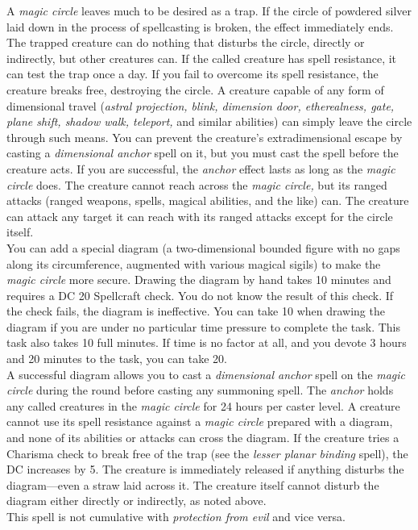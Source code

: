 A \textit{magic circle }leaves much to be desired as a trap. If the circle of powdered silver laid down in the process of spellcasting is broken, the effect immediately ends. The trapped creature can do nothing that disturbs the circle, directly or indirectly, but other creatures can. If the called creature has spell resistance, it can test the trap once a day. If you fail to overcome its spell resistance, the creature breaks free, destroying the circle. A creature capable of any form of dimensional travel (\textit{astral projection, blink, dimension door, etherealness, gate, plane shift, shadow walk, teleport, }and similar abilities) can simply leave the circle through such means. You can prevent the creature's extradimensional escape by casting a \textit{dimensional anchor }spell on it, but you must cast the spell before the creature acts. If you are successful, the \textit{anchor }effect lasts as long as the \textit{magic circle }does. The creature cannot reach across the \textit{magic circle, }but its ranged attacks (ranged weapons, spells, magical abilities, and the like) can. The creature can attack any target it can reach with its ranged attacks except for the circle itself.\\
You can add a special diagram (a two-dimensional bounded figure with no gaps along its circumference, augmented with various magical sigils) to make the \textit{magic circle }more secure. Drawing the diagram by hand takes 10 minutes and requires a DC 20 Spellcraft check. You do not know the result of this check. If the check fails, the diagram is ineffective. You can take 10 when drawing the diagram if you are under no particular time pressure to complete the task. This task also takes 10 full minutes. If time is no factor at all, and you devote 3 hours and 20 minutes to the task, you can take 20.\\
A successful diagram allows you to cast a \textit{dimensional anchor }spell on the \textit{magic circle }during the round before casting any summoning spell. The \textit{anchor }holds any called creatures in the \textit{magic circle }for 24 hours per caster level. A creature cannot use its spell resistance against a \textit{magic circle }prepared with a diagram, and none of its abilities or attacks can cross the diagram. If the creature tries a Charisma check to break free of the trap (see the \textit{lesser planar binding }spell), the DC increases by 5. The creature is immediately released if anything disturbs the diagram—even a straw laid across it. The creature itself cannot disturb the diagram either directly or indirectly, as noted above.\\
This spell is not cumulative with \textit{protection from evil }and vice versa.\\
